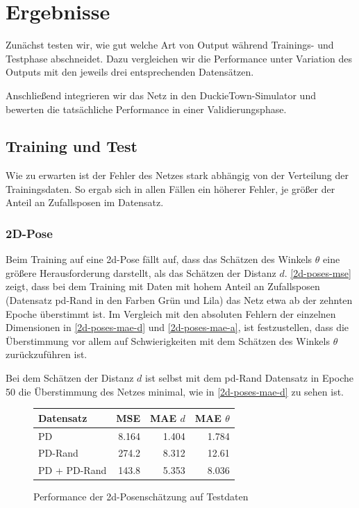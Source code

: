 \chapter{Ergebnisse}

Zunächst testen wir, wie gut welche Art von Output während Trainings- und Testphase abschneidet. Dazu vergleichen wir die Performance unter Variation des Outputs mit den jeweils drei entsprechenden Datensätzen. 

Anschließend integrieren wir das Netz in den DuckieTown-Simulator und bewerten die tatsächliche Performance in einer Validierungsphase.

\section{Training und Test}

Wie zu erwarten ist der Fehler des Netzes stark abhängig von der Verteilung der Trainingsdaten. So ergab sich in allen Fällen ein höherer Fehler, je größer der Anteil an Zufallsposen im Datensatz. 

\subsection{2D-Pose}

Beim Training auf eine \acs{2d}-Pose fällt auf, dass das Schätzen des Winkels $\theta$ eine größere Herausforderung darstellt, als das Schätzen der Distanz $d$. \ref{2d-poses-mse} zeigt, dass bei dem Training mit Daten mit hohem Anteil an Zufallsposen (Datensatz \glqq\acs{pd}-Rand\grqq{} in den Farben Grün und Lila) das Netz etwa ab der zehnten Epoche überstimmt ist. Im Vergleich mit den absoluten Fehlern der einzelnen Dimensionen in \ref{2d-poses-mae-d} und \ref{2d-poses-mae-a}, ist festzustellen, dass die Überstimmung vor allem auf Schwierigkeiten mit dem Schätzen des Winkels $\theta$ zurückzuführen ist.

Bei dem Schätzen der Distanz $d$ ist selbst mit dem \glqq\acs{pd}-Rand\grqq{} Datensatz in Epoche 50 die Überstimmung des Netzes minimal, wie in \ref{2d-poses-mae-d} zu sehen ist.


\begin{figure}[H]
	\centering
		\begin{tabular}[t]{|l|r|r|r|}
			\hline
			Datensatz & MSE & MAE $d$ & MAE $\theta$ \\
			\hline
			PD & 8.164 & 1.404 & 1.784 \\
			\hline
			PD-Rand & 274.2 & 8.312 & 12.61 \\
			\hline
			PD + PD-Rand & 143.8 & 5.353 & 8.036 \\
			\hline
		\end{tabular}
	\caption{Performance der \acs{2d}-Posenschätzung auf Testdaten}
	\label{2d-pose-performance}
\end{figure}

